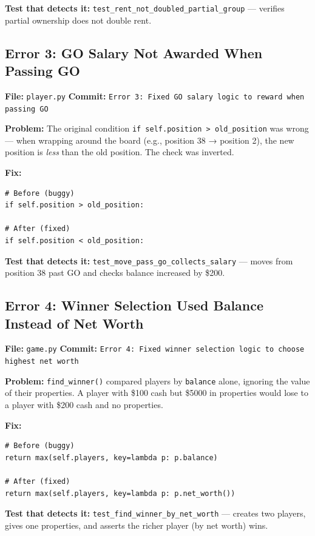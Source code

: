 \documentclass[12pt,a4paper]{article}
\begin{document}
\textbf{Test that detects it:} \texttt{test\_rent\_not\_doubled\_partial\_group} --- verifies partial ownership does not double rent.


\subsection{Error 3: GO Salary Not Awarded When Passing GO}
\textbf{File:} \texttt{player.py} \quad \textbf{Commit:} \texttt{Error 3: Fixed GO salary logic to reward when passing GO}

\textbf{Problem:} The original condition \texttt{if self.position > old\_position} was wrong --- when wrapping around the board (e.g., position 38 → position 2), the new position is \textit{less} than the old position. The check was inverted.

\textbf{Fix:}
\begin{lstlisting}
# Before (buggy)
if self.position > old_position:

# After (fixed)
if self.position < old_position:
\end{lstlisting}

\textbf{Test that detects it:} \texttt{test\_move\_pass\_go\_collects\_salary} --- moves from position 38 past GO and checks balance increased by \$200.


\subsection{Error 4: Winner Selection Used Balance Instead of Net Worth}
\textbf{File:} \texttt{game.py} \quad \textbf{Commit:} \texttt{Error 4: Fixed winner selection logic to choose highest net worth}

\textbf{Problem:} \texttt{find\_winner()} compared players by \texttt{balance} alone, ignoring the value of their properties. A player with \$100 cash but \$5000 in properties would lose to a player with \$200 cash and no properties.

\textbf{Fix:}
\begin{lstlisting}
# Before (buggy)
return max(self.players, key=lambda p: p.balance)

# After (fixed)
return max(self.players, key=lambda p: p.net_worth())
\end{lstlisting}

\textbf{Test that detects it:} \texttt{test\_find\_winner\_by\_net\_worth} --- creates two players, gives one properties, and asserts the richer player (by net worth) wins.
\end{document}
